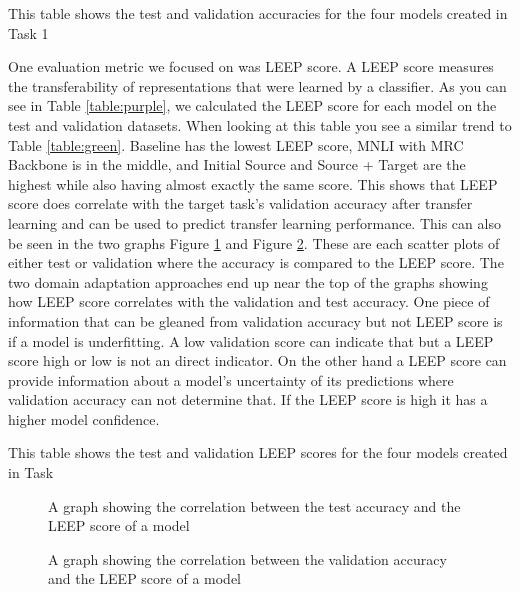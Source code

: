 \documentclass[10pt]{article}
\begin{document}
\begin{table}[h]
  \centering
  \caption{This table shows the test and validation accuracies for the four models created in Task 1}
  \label{table:green}
\end{table}

One evaluation metric we focused on was LEEP score. A LEEP 
score measures the transferability of representations that 
were learned by a classifier. As you can see in Table \ref{table:purple}, 
we calculated the LEEP score for each model on the test and validation 
datasets. When looking at this table you see a similar trend 
to Table \ref{table:green}. Baseline has the lowest LEEP 
score, MNLI with MRC Backbone is in the middle, and Initial 
Source and Source + Target are the highest while also having 
almost exactly the same score. This shows that LEEP score 
does correlate with the target task’s validation accuracy 
after transfer learning and can be used to predict transfer 
learning performance. This can also be seen in the two 
graphs Figure \ref{fig:1} and Figure \ref{fig:2}. These are 
each scatter plots of either test or validation where the 
accuracy is compared to the LEEP score. The two domain 
adaptation approaches end up near the top of the graphs 
showing how LEEP score correlates with the validation and 
test accuracy. One piece of information that can be gleaned from 
validation accuracy but not LEEP score is if a model is underfitting.
A low validation score can indicate that but a LEEP score high or low 
is not an direct indicator. On the other hand a LEEP score can provide 
information about a model’s uncertainty of its predictions where validation 
accuracy can not determine that. If the LEEP score is high it has a higher 
model confidence. 


\begin{table}[h]
  \centering
  \caption{This table shows the test and validation LEEP scores for the four models created in Task}
  \label{table:purple}
\end{table}

\begin{figure}[h]
  \centering
  \caption{A graph showing the correlation between the test accuracy and the LEEP score of a model}
  \label{fig:1}
\end{figure}

\begin{figure}[h]
  \centering
  \caption{A graph showing the correlation between the validation accuracy and the LEEP score of a model}
  \label{fig:2}
\end{figure}
\end{document}
